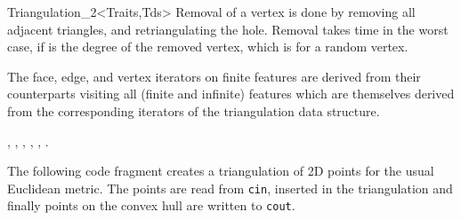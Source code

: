\begin{ccRefClass}{Triangulation_2<Traits,Tds>}
Removal of a vertex is done by removing all adjacent triangles, and
retriangulating the hole. Removal takes time  in the worst
case, if  is the degree of the removed vertex,
which is  for a random vertex.

The face, edge, and vertex iterators on finite features
are derived from their counterparts visiting all (finite and infinite)
features which are themselves derived from the corresponding iterators
of the triangulation data structure.



\ccSeeAlso

,
,
,
,
,
.




\ccExample

The following code fragment creates a  triangulation of 2D points
for the  usual Euclidean metric. The points are read from {\tt cin},
inserted in the triangulation 
and finally points on the convex hull are written to {\tt cout}. 



\end{ccRefClass}


